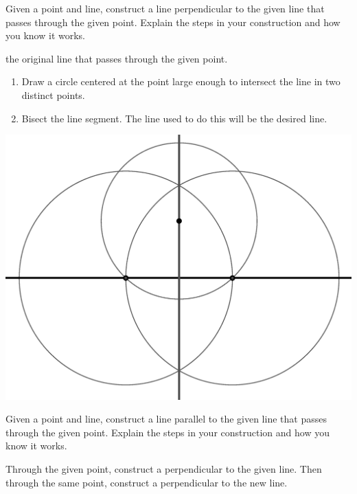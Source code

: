 \documentclass[nooutcomes]{ximera}
\begin{document}
\begin{problem}
Given a point and line, construct a line perpendicular to the given line that passes through the given point. Explain the steps in your construction and how you know it works.
\begin{freeResponse}
\begin{hint} 
the original line that passes through the given point.
\begin{enumerate}
\item Draw a circle centered at the point large enough  
       to intersect the line in two distinct points.
\item Bisect the line segment. The line used to do this 
       will be the desired line.
\end{enumerate}
\begin{image}
\includegraphics{perpfrompoint.png}
\end{image}
\end{hint}
\end{freeResponse}
\end{problem}

\begin{problem}
Given a point and line, construct a line parallel to the given line that passes through the given point. Explain the steps in your construction and how you know it works.
\begin{freeResponse}
\begin{hint}
Through the given point, construct a perpendicular to the given line.  Then through the same point, construct a perpendicular to the new line. 
\end{hint}
\end{freeResponse}
\end{problem}
\end{document}
